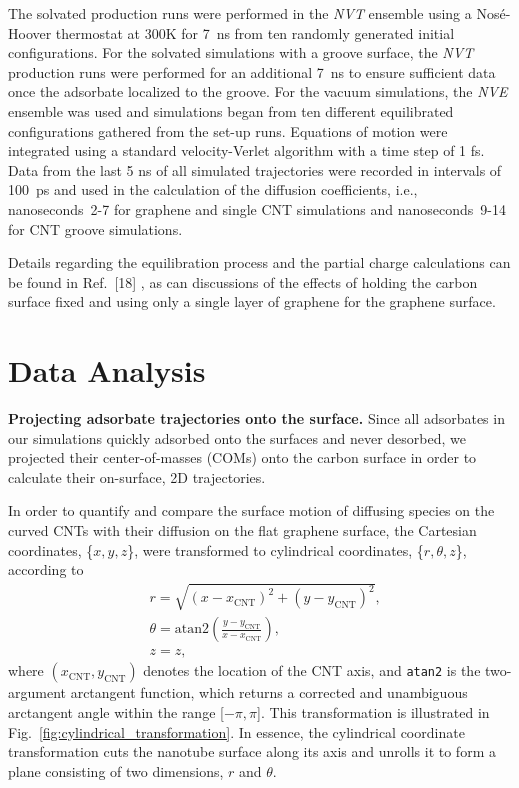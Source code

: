 \documentclass[journal=jpcbfk, layout=twocolumn, manuscript=article]{achemso}
\newcommand\ddfrac[2]{\frac{\displaystyle #1}{\displaystyle #2}}
\begin{document}
The solvated production runs were performed in the \textit{NVT} ensemble using a Nos\'{e}-Hoover thermostat at 300K for 7~ns from ten randomly generated initial configurations. For the solvated simulations with a groove surface, the \textit{NVT} production runs were performed for an additional 7~ns to ensure sufficient data once the adsorbate localized to the groove. For the vacuum simulations, the \textit{NVE} ensemble was used and simulations began from ten different equilibrated configurations gathered from the set-up runs. Equations of motion were integrated using a standard velocity-Verlet algorithm with a time step of 1 fs. Data from the last 5 ns of all simulated trajectories were recorded in intervals of 100~ps and used in the calculation of the diffusion coefficients, i.e., nanoseconds~2-7 for graphene and single CNT simulations and nanoseconds~9-14 for CNT groove simulations.

Details regarding the equilibration process and the partial charge calculations can be found in Ref.~[18]%
, as can discussions of the effects of holding the carbon surface fixed and using only a single layer of graphene for the graphene surface. 

\section{Data Analysis}

{\bf{Projecting adsorbate trajectories onto the surface.}} Since all adsorbates in our simulations quickly adsorbed onto the surfaces and never desorbed, we projected their center-of-masses (COMs) onto the carbon surface in order to calculate their on-surface, 2D trajectories. 

In order to quantify and compare the surface motion of diffusing species on the curved CNTs with their diffusion on the flat graphene surface, the Cartesian coordinates, \{$x,y,z$\}, were transformed to cylindrical coordinates, \{$r,\theta,z$\}, according to
\begin{equation}
\begin{split}
&r=\sqrt{(x-x_\mathrm{CNT})^2+(y-y_\mathrm{CNT})^2},\\
&\theta=\mathrm{atan2}(\ddfrac{y-y_\mathrm{CNT}}{x-x_\mathrm{CNT}}),\\
&z=z,
\end{split}
\label{eqn:cylindrical_transformation}
\end{equation}
where $(x_\mathrm{CNT},y_\mathrm{CNT})$ denotes the location of the CNT axis, and \texttt{atan2} is the two-argument arctangent function, which returns a corrected and unambiguous arctangent angle within the range [$-\pi,\pi$]. This transformation is illustrated in Fig.~\ref{fig:cylindrical_transformation}. In essence, the cylindrical coordinate transformation cuts the nanotube surface along its axis and unrolls it to form a plane consisting of two dimensions, $r$ and $\theta$.
\end{document}
